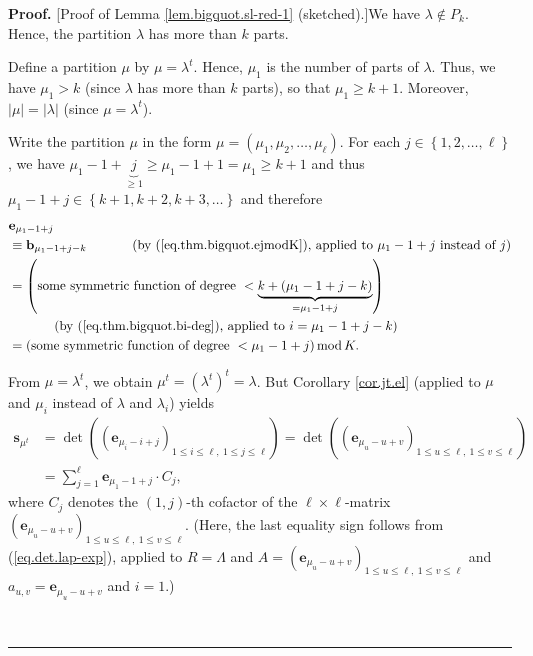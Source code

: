 \documentclass[numbers=enddot,12pt,final,onecolumn,notitlepage]{scrartcl}%
\theoremstyle{definition}
\newenvironment{proof}[1][Proof]{\noindent\textbf{#1.} }{\ \rule{0.5em}{0.5em}}
\let\sumnonlimits\sum
\renewcommand{\sum}{\sumnonlimits\limits}
\begin{document}
\begin{proof}
[Proof of Lemma \ref{lem.bigquot.sl-red-1} (sketched).]We have $\lambda\notin
P_{k}$. Hence, the partition $\lambda$ has more than $k$ parts.

Define a partition $\mu$ by $\mu=\lambda^{t}$. Hence, $\mu_{1}$ is the number
of parts of $\lambda$. Thus, we have $\mu_{1}>k$ (since $\lambda$ has more
than $k$ parts), so that $\mu_{1}\geq k+1$. Moreover, $\left\vert
\mu\right\vert =\left\vert \lambda\right\vert $ (since $\mu=\lambda^{t}$).

Write the partition $\mu$ in the form $\mu=\left(  \mu_{1},\mu_{2},\ldots
,\mu_{\ell}\right)  $. For each $j\in\left\{  1,2,\ldots,\ell\right\}  $, we
have $\mu_{1}-1+\underbrace{j}_{\geq1}\geq\mu_{1}-1+1=\mu_{1}\geq k+1$ and
thus $\mu_{1}-1+j\in\left\{  k+1,k+2,k+3,\ldots\right\}  $ and therefore%
\begin{align}
&  \mathbf{e}_{\mu_{1}-1+j}\nonumber\\
&  \equiv\mathbf{b}_{\mu_{1}-1+j-k}\ \ \ \ \ \ \ \ \ \ \left(  \text{by
(\ref{eq.thm.bigquot.ejmodK}), applied to }\mu_{1}-1+j\text{ instead of
}j\right) \nonumber\\
&  =\left(  \text{some symmetric function of degree }<\underbrace{k+\left(
\mu_{1}-1+j-k\right)  }_{=\mu_{1}-1+j}\right) \nonumber\\
&  \ \ \ \ \ \ \ \ \ \ \left(  \text{by (\ref{eq.thm.bigquot.bi-deg}), applied
to }i=\mu_{1}-1+j-k\right) \nonumber\\
&  =\left(  \text{some symmetric function of degree }<\mu_{1}-1+j\right)
\operatorname{mod}K. \label{pf.lem.bigquot.sl-red-1.e-red}%
\end{align}


From $\mu=\lambda^{t}$, we obtain $\mu^{t}=\left(  \lambda^{t}\right)
^{t}=\lambda$. But Corollary \ref{cor.jt.el} (applied to $\mu$ and $\mu_{i}$
instead of $\lambda$ and $\lambda_{i}$) yields%
\begin{align}
\mathbf{s}_{\mu^{t}}  &  =\det\left(  \left(  \mathbf{e}_{\mu_{i}-i+j}\right)
_{1\leq i\leq\ell,\ 1\leq j\leq\ell}\right)  =\det\left(  \left(
\mathbf{e}_{\mu_{u}-u+v}\right)  _{1\leq u\leq\ell,\ 1\leq v\leq\ell}\right)
\nonumber\\
&  =\sum_{j=1}^{\ell}\mathbf{e}_{\mu_{1}-1+j}\cdot C_{j},
\label{pf.lem.bigquot.sl-red.JT1}%
\end{align}
where $C_{j}$ denotes the $\left(  1,j\right)  $-th cofactor of the
$\ell\times\ell$-matrix $\left(  \mathbf{e}_{\mu_{u}-u+v}\right)  _{1\leq
u\leq\ell,\ 1\leq v\leq\ell}$. (Here, the last equality sign follows from
(\ref{eq.det.lap-exp}), applied to $R=\Lambda$ and $A=\left(  \mathbf{e}%
_{\mu_{u}-u+v}\right)  _{1\leq u\leq\ell,\ 1\leq v\leq\ell}$ and
$a_{u,v}=\mathbf{e}_{\mu_{u}-u+v}$ and $i=1$.)


\end{proof}
\end{document}
